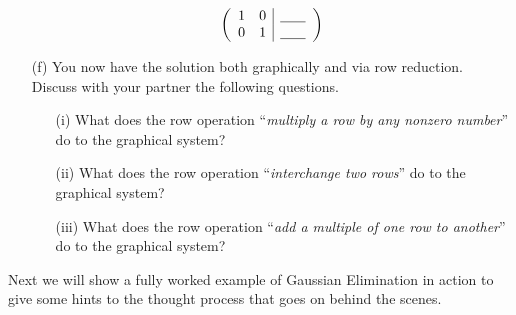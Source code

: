 \begin{problem}
\begin{enumerate}
            \begin{minipage}{0.3\columnwidth}
            \[ \left( \begin{array}{cc|c} 1 & 0 &  \underline{\hspace{0.25in}} \\  0 &
                        1 &  \underline{\hspace{0.25in}}
                \end{array} \right) \]
            \end{minipage}
            \begin{minipage}{0.6\columnwidth}
            \begin{center}
            \end{center}
            \end{minipage}
        \item[(f)] You now have the solution both graphically and via row reduction.
            Discuss with your partner the following questions. \\
            \begin{enumerate}
                \item[(i)] What does the row operation ``{\it multiply a row by any
                    nonzero number}'' do to the graphical system?
                \item[(ii)] What does the row operation ``{\it interchange two rows}'' do
                    to the graphical system?
                \item[(iii)] What does the row operation ``{\it add a multiple of one row
                    to another}'' do to the graphical system?
            \end{enumerate}
    \end{enumerate}
\end{problem}


Next we will show a fully worked example of Gaussian Elimination in action to give some
hints to the thought process that goes on behind the scenes.  


